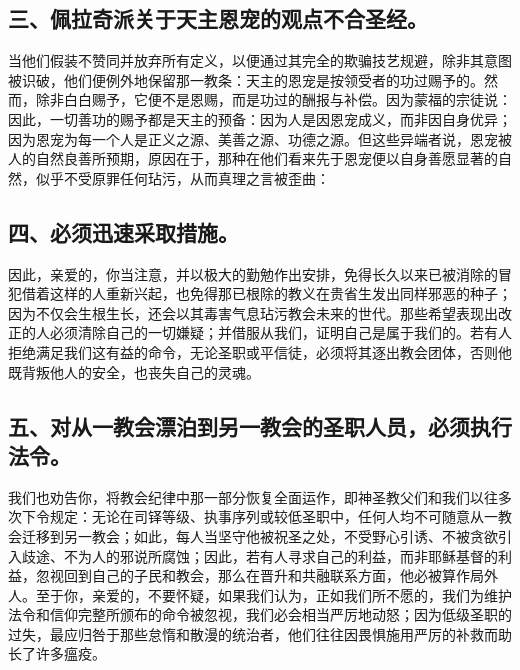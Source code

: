 
\subsection{三、佩拉奇派关于天主恩宠的观点不合圣经。}

当他们假装不赞同并放弃所有定义，以便通过其完全的欺骗技艺规避，除非其意图被识破，他们便例外地保留那一教条：天主的恩宠是按领受者的功过赐予的。然而，除非白白赐予，它便不是恩赐，而是功过的酬报与补偿。因为蒙福的宗徒说： 因此，一切善功的赐予都是天主的预备：因为人是因恩宠成义，而非因自身优异；因为恩宠为每一个人是正义之源、美善之源、功德之源。但这些异端者说，恩宠被人的自然良善所预期，原因在于，那种在他们看来先于恩宠便以自身善愿显著的自然，似乎不受原罪任何玷污，从而真理之言被歪曲：\par


\subsection{四、必须迅速采取措施。}

因此，亲爱的，你当注意，并以极大的勤勉作出安排，免得长久以来已被消除的冒犯借着这样的人重新兴起，也免得那已根除的教义在贵省生发出同样邪恶的种子；因为不仅会生根生长，还会以其毒害气息玷污教会未来的世代。那些希望表现出改正的人必须清除自己的一切嫌疑；并借服从我们，证明自己是属于我们的。若有人拒绝满足我们这有益的命令，无论圣职或平信徒，必须将其逐出教会团体，否则他既背叛他人的安全，也丧失自己的灵魂。\par


\subsection{五、对从一教会漂泊到另一教会的圣职人员，必须执行法令。}

我们也劝告你，将教会纪律中那一部分恢复全面运作，即神圣教父们和我们以往多次下令规定：无论在司铎等级、执事序列或较低圣职中，任何人均不可随意从一教会迁移到另一教会；如此，每人当坚守他被祝圣之处，不受野心引诱、不被贪欲引入歧途、不为人的邪说所腐蚀；因此，若有人寻求自己的利益，而非耶稣基督的利益，忽视回到自己的子民和教会，那么在晋升和共融联系方面，他必被算作局外人。至于你，亲爱的，不要怀疑，如果我们认为，正如我们所不愿的，我们为维护法令和信仰完整所颁布的命令被忽视，我们必会相当严厉地动怒；因为低级圣职的过失，最应归咎于那些怠惰和散漫的统治者，他们往往因畏惧施用严厉的补救而助长了许多瘟疫。\par


